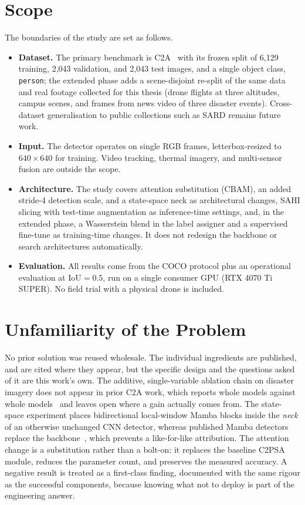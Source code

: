 \section{Scope}
The boundaries of the study are set as follows.
\begin{itemize}
  \item \textbf{Dataset.} The primary benchmark is C2A~\cite{nihal2024c2a}
        with its frozen split of 6{,}129 training, 2{,}043 validation, and
        2{,}043 test images, and a single object class, \texttt{person}; the
        extended phase adds a scene-disjoint re-split of the same data and
        real footage collected for this thesis (drone flights at three
        altitudes, campus scenes, and frames from news video of three
        disaster events). Cross-dataset generalisation to public collections
        such as SARD remains future work.
  \item \textbf{Input.} The detector operates on single RGB frames,
        letterbox-resized to $640 \times 640$ for training. Video tracking,
        thermal imagery, and multi-sensor fusion are outside the scope.
  \item \textbf{Architecture.} The study covers attention substitution
        (CBAM), an added stride-4 detection scale, and a state-space neck as
        architectural changes, SAHI slicing with test-time augmentation as
        inference-time settings, and, in the extended phase, a Wasserstein
        blend in the label assigner and a supervised fine-tune as
        training-time changes. It does not redesign the backbone or search
        architectures automatically.
  \item \textbf{Evaluation.} All results come from the COCO protocol plus an
        operational evaluation at $\mathrm{IoU} = 0.5$, run on a single
        consumer GPU (RTX 4070 Ti SUPER). No field trial with a physical
        drone is included.
\end{itemize}

\section{Unfamiliarity of the Problem}
No prior solution was reused wholesale. The individual ingredients are
published, and are cited where they appear, but the specific design and the
questions asked of it are this work's own. The additive, single-variable
ablation chain on disaster imagery does not appear in prior C2A work, which
reports whole models against whole models~\cite{nihal2024c2a} and leaves open
where a gain actually comes from. The state-space experiment places
bidirectional local-window Mamba blocks inside the \emph{neck} of an
otherwise unchanged CNN detector, whereas published Mamba detectors replace
the backbone~\cite{wang2025mambayolo}, which prevents a like-for-like
attribution. The attention change is a substitution rather than a bolt-on: it
replaces the baseline C2PSA module, reduces the parameter count, and preserves
the measured accuracy. A negative result is treated as a first-class finding,
documented with
the same rigour as the successful components, because knowing what not to
deploy is part of the engineering answer.

